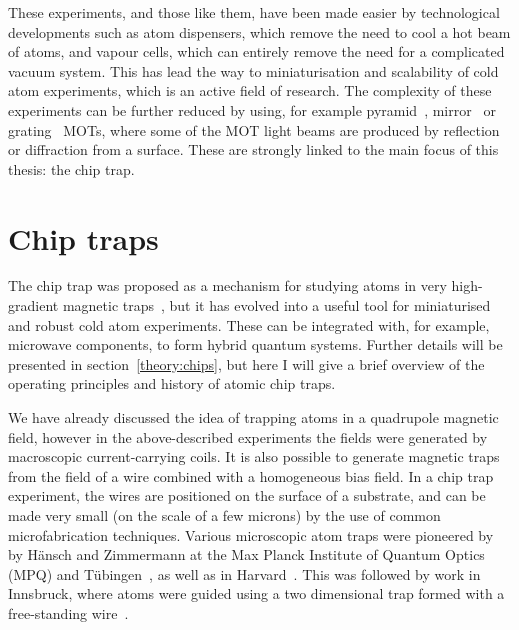 These experiments, and those like them, have been made easier by technological
developments such as atom dispensers, which remove the need to cool
a hot beam of atoms, and vapour cells, which can entirely remove the
need for a complicated vacuum system. This has lead the way to miniaturisation
and scalability of cold atom experiments, which is an active field of research.
The complexity of these experiments can be further reduced by using, for
example pyramid~\cite{Lee:96}, mirror~\cite{Reichel1999, 4797887} or
grating~\cite{Nshii2013} MOTs, where some of the MOT light beams are produced
by reflection or diffraction from a surface. These are strongly linked to the
main focus of this thesis: the chip trap.

\section{Chip traps}

The chip trap was proposed as a mechanism for studying atoms in very
high-gradient magnetic traps~\cite{PhysRevA.52.4004}, but it has evolved into a
useful tool for miniaturised and robust cold atom experiments. These can be
integrated with, for example, microwave components, to form hybrid quantum
systems. Further details will be presented in section~\ref{theory:chips}, but
here I will give a brief overview of the operating principles and history of
atomic chip traps.

We have already discussed the idea of trapping atoms in a quadrupole magnetic
field, however in the above-described experiments the fields were generated by
macroscopic current-carrying coils. It is also possible to generate magnetic
traps from the field of a wire combined with a homogeneous bias field. In a
chip trap experiment, the wires are positioned on the surface of a substrate,
and can be made very small (on the scale of a few microns) by the use of common
microfabrication techniques. Various microscopic atom traps were pioneered by
by H\"ansch and Zimmermann at the Max Planck Institute of Quantum Optics (MPQ)
and T\"ubingen~\cite{PhysRevLett.80.1634, PhysRevLett.81.5310}, as well as in
Harvard~\cite{Drindic1998}. This was followed by work in Innsbruck, where \Li{}
atoms were guided using a two dimensional trap formed with a free-standing
wire~\cite{PhysRevLett.82.2014}. 

